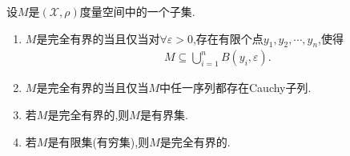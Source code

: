 \documentclass[../../main.tex]{subfiles}%
\begin{document}
\begin{proposition}\label{proposition:完全有界必有界}
设$M$是$(\mathscr{X},\rho)$度量空间中的一个子集.
\begin{enumerate}[(1)]
\item\label{proposition:完全有界必有界-0} $M$是完全有界的当且仅当对$\forall \varepsilon >0$,存在有限个点$y_1,y_2,\cdots,y_n$,使得
\begin{align*}
M\subseteq \bigcup_{i=1}^n{B\left( y_i,\varepsilon \right)}.
\end{align*}

\item\label{proposition:完全有界必有界-3} $M$是完全有界的当且仅当$M$中任一序列都存在Cauchy子列.

\item\label{proposition:完全有界必有界-1} 若$M$是完全有界的,则$M$是有界集.

\item\label{proposition:完全有界必有界-2} 若$M$是有限集(有穷集),则$M$是完全有界的.
\end{enumerate}
\end{proposition}
\end{document}
